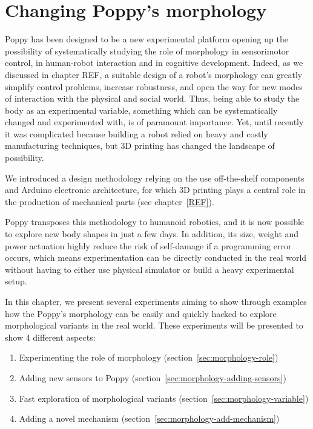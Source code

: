 
% 


\chapter{Changing Poppy's morphology} %
\label{cha:changing_morphology}


Poppy has been designed to be a new experimental platform opening up the possibility of systematically studying the role of morphology in sensorimotor control, in human-robot interaction and in cognitive development. Indeed, as we discussed in chapter REF, a suitable design of a robot’s morphology can greatly simplify control problems, increase robustness, and open the way for new modes of interaction with the physical and social world. Thus, being able to study the body as an experimental variable, something which can be systematically changed and experimented with, is of paramount importance. Yet, until recently it was complicated because building a robot relied on heavy and costly manufacturing techniques, but 3D printing has changed the landscape of possibility.

We introduced a design methodology relying on the use off-the-shelf components and Arduino electronic architecture, for which 3D printing plays a central role in the production of mechanical parts (see chapter~\ref{REF}).

Poppy transposes this methodology to humanoid robotics, and it is now possible to explore new body shapes in just a few days. In addition, its size, weight and power actuation highly reduce the risk of self-damage if a programming error occurs, which means experimentation can be directly conducted in the real world without having to either use physical simulator or build a heavy experimental setup.

In this chapter, we present several experiments aiming to show through examples how the Poppy's morphology can be easily and quickly hacked  to explore morphological variants in the real world.
These experiments will be presented to show 4 different aspects:

\begin{enumerate}
    \item Experimenting the role of morphology (section~\ref{sec:morphology-role})
    \item Adding new sensors to Poppy (section~\ref{sec:morphology-adding-sensors})
    \item Fast exploration of morphological variants (section~\ref{sec:morphology-variable})
    \item Adding a novel mechanism (section~\ref{sec:morphology-add-mechanism})
\end{enumerate}



